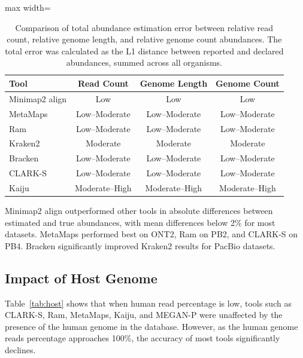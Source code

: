 \documentclass{article}
\begin{document}
\begin{table}[htbp]
\centering
\caption{Comparison of total abundance estimation error between relative read count, relative genome length, and relative genome count abundances. The total error was calculated as the L1 distance between reported and declared abundances, summed across all organisms.}
\label{tab:abundance}
\begin{adjustbox}{max width=\textwidth}
\begin{tabular}{lccc}
\toprule
Tool & Read Count & Genome Length & Genome Count \\
\midrule
Minimap2 align & Low & Low & Low \\
MetaMaps & Low--Moderate & Low--Moderate & Low--Moderate \\
Ram & Low--Moderate & Low--Moderate & Low--Moderate \\
Kraken2 & Moderate & Moderate & Moderate \\
Bracken & Low--Moderate & Low--Moderate & Low--Moderate \\
CLARK-S & Low--Moderate & Low--Moderate & Low--Moderate \\
Kaiju & Moderate--High & Moderate--High & Moderate--High \\
\bottomrule
\end{tabular}
\end{adjustbox}
\end{table}

Minimap2 align outperformed other tools in absolute differences between estimated and true abundances, with mean differences below 2\% for most datasets. MetaMaps performed best on ONT2, Ram on PB2, and CLARK-S on PB4. Bracken significantly improved Kraken2 results for PacBio datasets.

\subsection{Impact of Host Genome}

Table~\ref{tab:host} shows that when human read percentage is low, tools such as CLARK-S, Ram, MetaMaps, Kaiju, and MEGAN-P were unaffected by the presence of the human genome in the database. However, as the human genome reads percentage approaches 100\%, the accuracy of most tools significantly declines.
\end{document}

